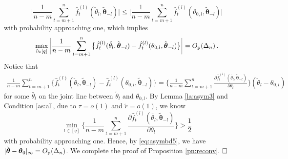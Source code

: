 \documentclass[12pt]{article}
\newcommand{\btheta}{\boldsymbol \theta}
\newcommand{\0}{{\bf 0}}
\begin{document}
\[
\bigg|\frac{1}{n-m}\sum_{t=m+1}^n\hat{f}_t^{(l)}(\check{\theta}_{l},\tilde{\btheta}_{-l})\bigg|\leq \bigg|\frac{1}{n-m}\sum_{t=m+1}^n\hat{f}_t^{(l)}(\theta_{0,l},\tilde{\btheta}_{-l})\bigg|
\]
with probability approaching one, 
which implies
\begin{align}
\max_{l\in[q]}\bigg|\frac{1}{n-m}\sum_{t=m+1}^n\big\{\hat{f}_t^{(l)}(\check{\theta}_{l},\tilde{\btheta}_{-l})-\hat{f}_t^{(l)}(\theta_{0,l},\tilde{\btheta}_{-l})\big\}\bigg|=O_{\rm p}(\Delta_n)\,.\label{eq:asymbd5}
\end{align}
Notice that
\begin{align*}%
\frac{1}{n-m}\sum_{t=m+1}^n\big\{\hat{f}_t^{(l)}(\check{\theta}_{l},\tilde{\btheta}_{-l})-\hat{f}_t^{(l)}(\theta_{0,l},\tilde{\btheta}_{-l})\big\}=\bigg\{\frac{1}{n-m}\sum_{t=m+1}^n\frac{\partial\hat{f}_t^{(l)}(\bar{\theta}_l,\tilde{\btheta}_{-l})}{\partial\theta_l}\bigg\}(\check{\theta}_l-\theta_{0,l})
\end{align*}
for some $\bar{\theta}_l$ on the joint line between $\check{\theta}_l$ and $\theta_{0,l}$. 
By Lemma \ref{la:asym3} and Condition \ref{as:al}, due to $\tau=o(1)$ and $\tilde{r}=o(1)$, we know
\[
\min_{l\in[q]}\bigg\{\frac{1}{n-m}\sum_{t=m+1}^n\frac{\partial\hat{f}_t^{(l)}(\bar{\theta}_l,\tilde{\btheta}_{-l})}{\partial\theta_l}\bigg\}>\frac{1}{2}
\]
with probability approaching one. Hence, by \eqref{eq:asymbd5}, we have $|\check{\btheta}-\btheta_{0}|_\infty=O_{\rm p}(\Delta_n)$. We complete the proof of Proposition \ref{pn:reconv}. $\hfill\Box$ 
\end{document}
